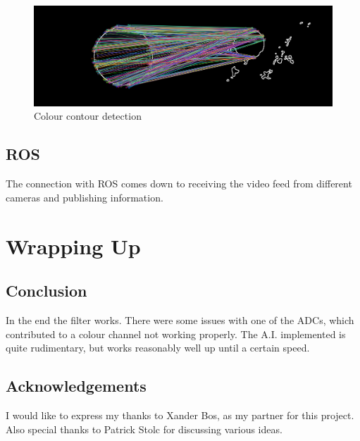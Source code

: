 \documentclass{report}
\begin{document}
\begin{figure}[h!]
\center
\includegraphics[width=1.0\textwidth]{../images/colourContourFeature_sphere.png}
\caption[]{Colour contour detection}
\label{fig:colourContourFeatureSphere}
\end{figure}

\section{ROS}
The connection with ROS comes down to receiving the video feed from different cameras and publishing information.

\chapter{Wrapping Up}
\section{Conclusion}
In the end the filter works. There were some issues with one of the ADCs, which contributed to a colour channel not working properly.
The A.I. implemented is quite rudimentary, but works reasonably well up until a certain speed.

\section{Acknowledgements}
I would like to express my thanks to Xander Bos, as my partner for this project.
Also special thanks to Patrick Stolc for discussing various ideas.

\printbibliography
{}
\end{document}
